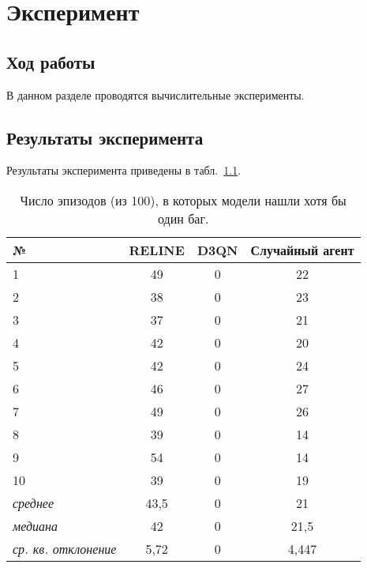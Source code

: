 \chapter{Эксперимент}
\label{cha:research}

\section{Ход работы}

В данном разделе проводятся вычислительные эксперименты.

\section{Результаты эксперимента}

Результаты эксперимента приведены в табл.~\ref{tab:results}.

\begin{table}[ht]
	\centering
	\caption{Число эпизодов (из 100), в которых модели нашли хотя бы один баг.}
	\begin{tabular}{ l c c c }
		\hline
		№ & RELINE & D3QN & Случайный агент \\
		\hline
		1 & 49 & 0 & 22\\
		2 & 38 & 0 & 23\\
		3 & 37 & 0 & 21\\
		4 & 42 & 0 & 20\\
		5 & 42 & 0 & 24\\
		6 & 46 & 0 & 27\\
		7 & 49 & 0 & 26\\
		8 & 39 & 0 & 14\\
		9 & 54 & 0 & 14\\
		10 & 39 & 0 & 19\\
		\hline
		\textit{среднее} & 43,5 & 0 & 21 \\
		\textit{медиана} & 42 & 0 & 21,5 \\
		\textit{ср. кв. отклонение} & 5,72 & 0 & 4,447 \\
		\hline
	\end{tabular}
	\label{tab:results}
\end{table}


